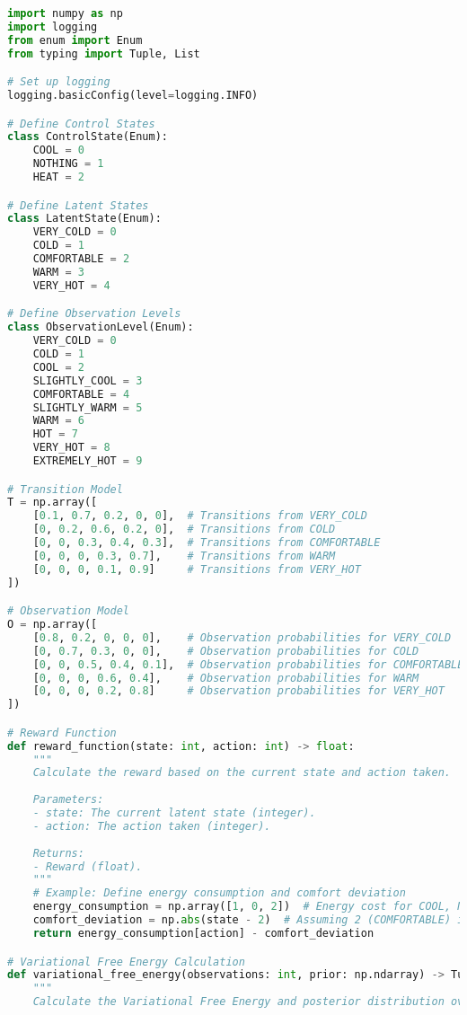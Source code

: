 \documentclass[11pt,a4paper]{article}
\begin{document}
\begin{lstlisting}[language=Python, caption={Implementation code for the POMDP with Active Inference}]
import numpy as np
import logging
from enum import Enum
from typing import Tuple, List

# Set up logging
logging.basicConfig(level=logging.INFO)

# Define Control States
class ControlState(Enum):
    COOL = 0
    NOTHING = 1
    HEAT = 2

# Define Latent States
class LatentState(Enum):
    VERY_COLD = 0
    COLD = 1
    COMFORTABLE = 2
    WARM = 3
    VERY_HOT = 4

# Define Observation Levels
class ObservationLevel(Enum):
    VERY_COLD = 0
    COLD = 1
    COOL = 2
    SLIGHTLY_COOL = 3
    COMFORTABLE = 4
    SLIGHTLY_WARM = 5
    WARM = 6
    HOT = 7
    VERY_HOT = 8
    EXTREMELY_HOT = 9

# Transition Model
T = np.array([
    [0.1, 0.7, 0.2, 0, 0],  # Transitions from VERY_COLD
    [0, 0.2, 0.6, 0.2, 0],  # Transitions from COLD
    [0, 0, 0.3, 0.4, 0.3],  # Transitions from COMFORTABLE
    [0, 0, 0, 0.3, 0.7],    # Transitions from WARM
    [0, 0, 0, 0.1, 0.9]     # Transitions from VERY_HOT
])

# Observation Model
O = np.array([
    [0.8, 0.2, 0, 0, 0],    # Observation probabilities for VERY_COLD
    [0, 0.7, 0.3, 0, 0],    # Observation probabilities for COLD
    [0, 0, 0.5, 0.4, 0.1],  # Observation probabilities for COMFORTABLE
    [0, 0, 0, 0.6, 0.4],    # Observation probabilities for WARM
    [0, 0, 0, 0.2, 0.8]     # Observation probabilities for VERY_HOT
])

# Reward Function
def reward_function(state: int, action: int) -> float:
    """
    Calculate the reward based on the current state and action taken.
    
    Parameters:
    - state: The current latent state (integer).
    - action: The action taken (integer).
    
    Returns:
    - Reward (float).
    """
    # Example: Define energy consumption and comfort deviation
    energy_consumption = np.array([1, 0, 2])  # Energy cost for COOL, NOTHING, HEAT
    comfort_deviation = np.abs(state - 2)  # Assuming 2 (COMFORTABLE) is the ideal state
    return energy_consumption[action] - comfort_deviation

# Variational Free Energy Calculation
def variational_free_energy(observations: int, prior: np.ndarray) -> Tuple[float, np.ndarray]:
    """
    Calculate the Variational Free Energy and posterior distribution over latent states.
    

\end{lstlisting}
\end{document}
